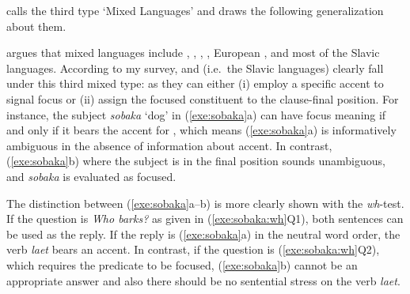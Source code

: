 \citet{buring:10} calls the third type `Mixed Languages' and draws the
following generalization about them.




\noindent \citeauthor{buring:10} argues that mixed languages include
, , , , European
, and most of the Slavic languages. According to my
survey,  and  (i.e.\ the
Slavic languages) clearly fall under this third mixed type: as they
can either (i) employ a specific accent to signal focus or (ii) assign
the focused constituent to the clause-final position.
For instance, the subject \textit{sobaka} `dog' in (\ref{exe:sobaka}a)
can have focus meaning if and only if it bears the accent for ,
which means (\ref{exe:sobaka}a) is informatively ambiguous in the
absence of information about accent.  In contrast, (\ref{exe:sobaka}b)
where the subject is in the final position sounds unambiguous, and
\textit{sobaka} is evaluated as focused.




\noindent The distinction between (\ref{exe:sobaka}a--b) is more
clearly shown with the \textit{wh}-test. If the
question is \textit{Who barks?} as given in (\ref{exe:sobaka:wh}Q1),
both sentences can be used as the reply. If the reply is
(\ref{exe:sobaka}a) in the neutral word order, the verb \textit{laet}
bears an accent. In contrast, if the question is
(\ref{exe:sobaka:wh}Q2), which requires the predicate to be focused,
(\ref{exe:sobaka}b) cannot be an appropriate answer and also there
should be no sentential stress on the verb \textit{laet}.




